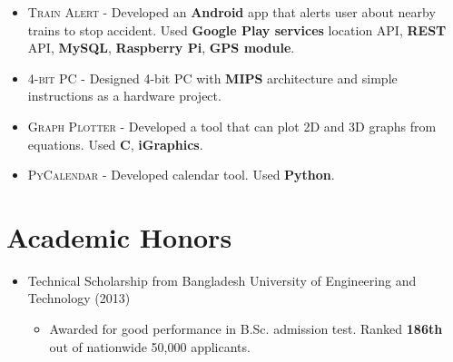 \documentclass[a4paper,10pt]{article}
\begin{document}
\begin{itemize}
    \item \textsc{Train Alert} - 
        Developed an \textbf{Android} app that alerts user about nearby trains to stop accident.
        Used \textbf{Google Play services} location API, \textbf{REST} API, \textbf{MySQL}, \textbf{Raspberry Pi}, \textbf{GPS module}.
    
   \item \textsc{4-bit PC} -  
       Designed 4-bit PC with \textbf{MIPS} architecture and  simple instructions as a hardware project.
   
   \item \textsc{Graph Plotter} - 
       Developed a tool that can plot \textsc{2D} and \textsc{3D} graphs from equations.
       Used \textbf{C}, \textbf{iGraphics}.
   
   \item \textsc{PyCalendar} - 
       Developed calendar tool. 
       Used \textbf{Python}.

\end{itemize}



\section{Academic Honors}
\begin{itemize}
    \item 
    Technical Scholarship from Bangladesh University of Engineering and Technology (2013)
    \begin{itemize}
        \item Awarded for good performance in B.Sc. admission test. Ranked \textbf{186th} out of nationwide 50,000 applicants.
    \end{itemize}
\end{itemize}
\end{document}
